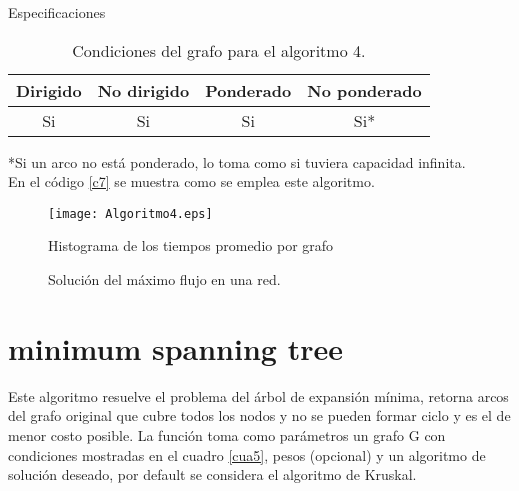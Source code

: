 \documentclass[12pt]{article}
\begin{document}
Especificaciones

\begin{table}[H] 
\caption{{\small Condiciones del grafo para el algoritmo 4.}}
\begin{center}
\begin{tabular}{|c|c|c|c|}
\hline
Dirigido & No dirigido & Ponderado & No ponderado \\ \hline
Si       & Si          & Si        & Si*        \\  \hline
\end{tabular}
\label{cua4}
\end{center}
\end{table}

*{\small Si un arco no está ponderado, lo toma como si tuviera capacidad infinita.}  \\

En el código \ref{c7} se muestra como se emplea este algoritmo.

 \label{c7}


\begin{figure}[H]
\begin{center}
	\texttt{[image: Algoritmo4.eps]}
\end{center}
\vspace{-.3cm}
\caption{{\small Histograma de los tiempos promedio por grafo}}
\end{figure}


\begin{figure}[H]
\centering
{}\hspace{5mm}
\vspace{10mm}
\hspace{10mm}
\vspace{10mm}
\caption{Solución del máximo flujo en una red.} \label{g4}
\end{figure}
\newpage
\section{minimum spanning tree}
Este algoritmo resuelve el problema del árbol de expansión mínima, retorna arcos del grafo original que cubre todos los nodos y no se pueden formar ciclo y es el de menor costo posible. La función toma como parámetros un grafo G con condiciones mostradas en el cuadro \ref{cua5}, pesos (opcional) y un algoritmo de solución deseado, por default se considera el algoritmo de Kruskal. 
\end{document}
